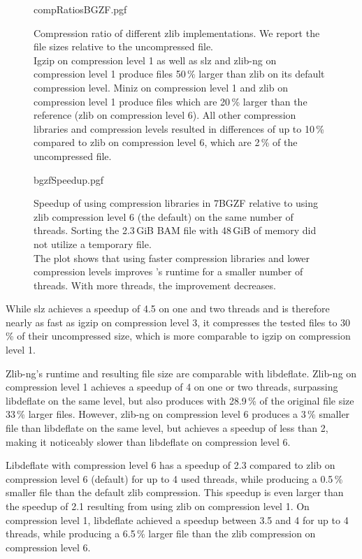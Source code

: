 \begin{figure}[!htb]
        {compRatiosBGZF.pgf}
    \caption{Compression ratio of different zlib implementations. We report the file sizes relative to the uncompressed file. \\
    Igzip on compression level 1 as well as slz and zlib-ng on compression level 1 produce files 50\,\% larger than zlib on its default compression level. Miniz on compression level 1 and zlib on compression level 1 produce files which are 20\,\% larger than the reference (zlib on compression level 6). All other compression libraries and compression levels resulted in differences of up to 10\,\% compared to zlib on compression level 6, which are 2\,\% of the uncompressed file.}
    \label{fig:bgzfComps}
\end{figure}
\begin{figure}[!htb]
        {bgzfSpeedup.pgf}
    \caption{Speedup of \sort using compression libraries in 7BGZF relative to \sort using zlib compression level 6 (the default) on the same number of threads.  Sorting the 2.3\,GiB BAM file with 48\,GiB of memory did not utilize a temporary file. \parents \threads \points \\
    The plot shows that using faster compression libraries and lower compression levels improves \sort's runtime for a smaller number of threads. With more threads, the improvement decreases.}
    \label{fig:bgzfspeed}
\end{figure}
While slz achieves a speedup of 4.5 on one and two threads  and is therefore nearly as fast as igzip on compression level 3, it compresses the tested files to 30\,\% of their uncompressed size, which is more comparable to igzip on compression level 1.

Zlib-ng's runtime and resulting file size are comparable with libdeflate. Zlib-ng on compression level 1 achieves a speedup of 4 on one or two threads, surpassing libdeflate on the same level, but also produces with 28.9\,\% of the original file size 33\,\% larger files. However, zlib-ng on compression level 6 produces a 3\,\% smaller file than libdeflate on the same level, but achieves a speedup of less than 2, making it noticeably slower than libdeflate on compression level 6. 

Libdeflate with compression level 6 has a speedup of 2.3 compared to zlib on compression level 6 (default) for up to 4 used threads, while producing a 0.5\,\% smaller file than the default zlib compression. This speedup is even larger than the speedup of 2.1 resulting from using zlib on compression level 1. On compression level 1, libdeflate achieved a speedup between 3.5 and 4 for up to 4 threads, while producing a 6.5\,\% larger file than the zlib compression on compression level 6.

